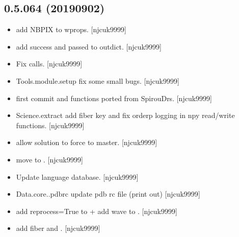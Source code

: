 \documentclass[a4paper,10pt,english]{report}
\begin{document}
\subsection{0.5.064 (2019\sphinxhyphen{}09\sphinxhyphen{}02)}
\label{\detokenize{misc/changelog:id98}}\begin{itemize}
\item {} 
 \sphinxhyphen{} add NBPIX to wprops. {[}njcuk9999{]}

\item {} 
 \sphinxhyphen{} add success and passed to outdict.
{[}njcuk9999{]}

\item {} 
Fix  calls. {[}njcuk9999{]}

\item {} 
Tools.module.setup \sphinxhyphen{} fix some small bugs. {[}njcuk9999{]}

\item {} 
 \sphinxhyphen{} first commit and functions ported from SpirouDrs.
{[}njcuk9999{]}

\item {} 
Science.extract \sphinxhyphen{} add fiber key and fix orderp logging in npy
read/write functions. {[}njcuk9999{]}

\item {} 
 \sphinxhyphen{} allow  solution to force to
master. {[}njcuk9999{]}

\item {} 
 \sphinxhyphen{} move  to .
{[}njcuk9999{]}

\item {} 
Update language database. {[}njcuk9999{]}

\item {} 
Data.core..pdbrc \sphinxhyphen{} update pdb rc file (print out) {[}njcuk9999{]}

\item {} 
 \sphinxhyphen{} add reprocess=True to  + add
wave to . {[}njcuk9999{]}

\item {} 
 \sphinxhyphen{} add fiber and .
{[}njcuk9999{]}


\end{itemize}
\end{document}
